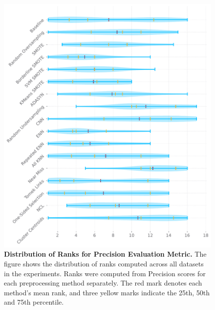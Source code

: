 \begin{figure}
    \centering
    \includegraphics[width=\linewidth]{figures/precision_ranks_distribution.pdf}
    \caption{
        \textbf{Distribution of Ranks for Precision Evaluation Metric.} The figure shows the
        distribution of ranks computed across all datasets in the experiments. Ranks were computed
        from Precision scores for each preprocessing method separately. The red mark denotes each
        method’s mean rank, and three yellow marks indicate the 25th, 50th and 75th percentile.
    }
    \label{figure:precision_rank_distributions}
\end{figure}

